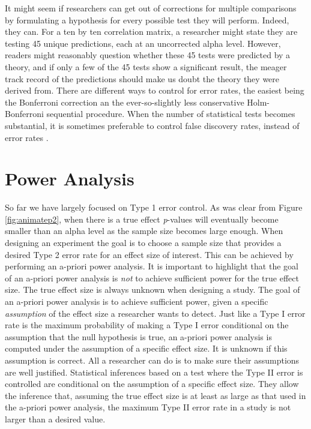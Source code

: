 \documentclass[
  oneside]{book}
\begin{document}
It might seem if researchers can get out of corrections for multiple comparisons by formulating a hypothesis for every possible test they will perform. Indeed, they can. For a ten by ten correlation matrix, a researcher might state they are testing 45 unique predictions, each at an uncorrected alpha level. However, readers might reasonably question whether these 45 tests were predicted by a theory, and if only a few of the 45 tests show a significant result, the meager track record of the predictions should make us doubt the theory they were derived from. There are different ways to control for error rates, the easiest being the Bonferroni correction an the ever-so-slightly less conservative Holm-Bonferroni sequential procedure. When the number of statistical tests becomes substantial, it is sometimes preferable to control false discovery rates, instead of error rates \citep{benjamini_controlling_1995}.

\hypertarget{power-analysis}{%
\section{Power Analysis}\label{power-analysis}}

So far we have largely focused on Type 1 error control. As was clear from Figure \ref{fig:animatep2}, when there is a true effect \emph{p}-values will eventually become smaller than an alpha level as the sample size becomes large enough. When designing an experiment the goal is to choose a sample size that provides a desired Type 2 error rate for an effect size of interest. This can be achieved by performing an a-priori power analysis. It is important to highlight that the goal of an a-priori power analysis is \emph{not} to achieve sufficient power for the true effect size. The true effect size is always unknown when designing a study. The goal of an a-priori power analysis is to achieve sufficient power, given a specific \emph{assumption} of the effect size a researcher wants to detect. Just like a Type I error rate is the maximum probability of making a Type I error conditional on the assumption that the null hypothesis is true, an a-priori power analysis is computed under the assumption of a specific effect size. It is unknown if this assumption is correct. All a researcher can do is to make sure their assumptions are well justified. Statistical inferences based on a test where the Type II error is controlled are conditional on the assumption of a specific effect size. They allow the inference that, assuming the true effect size is at least as large as that used in the a-priori power analysis, the maximum Type II error rate in a study is not larger than a desired value.
\end{document}
